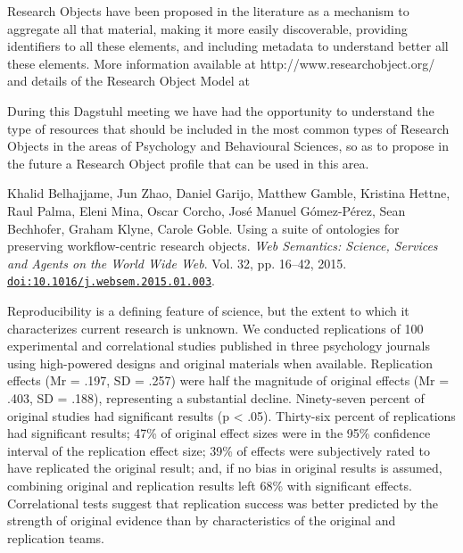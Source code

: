 \documentclass[a4paper,UKenglish]{dagrep}
\begin{document}
Research Objects have been proposed in the literature as a mechanism to aggregate all that 
material, making it more easily discoverable, providing identifiers to all these elements, and 
including metadata to understand better all these elements. More information available at 
http://www.researchobject.org/ and details of the Research Object Model at 
\cite{Belhajjame201516}

During this Dagstuhl meeting we have had the opportunity to understand the type of 
resources that should be included in the most common types of Research Objects in the areas 
of Psychology and Behavioural Sciences, so as to propose in the future a Research Object 
profile that can be used in this area.

\begin{thebibliography}{0}
Khalid Belhajjame, Jun Zhao, Daniel Garijo, Matthew Gamble, 
Kristina Hettne, Raul Palma, Eleni Mina, Oscar Corcho, Jos{\'e} Manuel 
G{\'o}mez-P{\'e}rez, Sean Bechhofer, Graham Klyne, Carole Goble. Using a suite of ontologies for preserving workflow-centric research objects.  \textit{Web Semantics: Science, Services and Agents on the World Wide Web}.  Vol. 32, pp. 16–42, 2015.  \href{http://dx.doi.org/10.1016/j.websem.2015.01.003}{\nolinkurl{doi:10.1016/j.websem.2015.01.003}}.
\end{thebibliography}

  


{}
\license
{}
Reproducibility is a defining feature of science, but the extent to which it characterizes 
current research is unknown.  We conducted replications of 100 experimental and 
correlational studies published in three psychology journals using high-powered designs and 
original materials when available.  Replication effects (Mr = .197, SD = .257) were half the 
magnitude of original effects (Mr = .403, SD = .188), representing a substantial decline.  
Ninety-seven percent of original studies had significant results (p < .05).  Thirty-six percent 
of replications had significant results; 47\% of original effect sizes were in the 95\% confidence 
interval of the replication effect size; 39\% of effects were subjectively rated to have replicated 
the original result; and, if no bias in original results is assumed, combining original and 
replication results left 68\% with significant effects. Correlational tests suggest that replication 
success was better predicted by the strength of original evidence than by characteristics of 
the original and replication teams.
\end{document}
